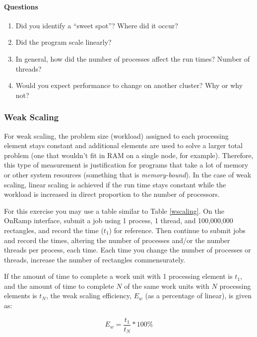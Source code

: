\documentclass[a4paper, 11pt]{article}
\begin{document}
\bigskip
\paragraph{Questions}
\begin{enumerate}
\item Did you identify a ``sweet spot''? Where did it occur?
\item Did the program scale linearly?
\item In general, how did the number of processes affect the run times? Number of threads?
\item Would you expect performance to change on another cluster? Why or why not?
\end{enumerate}


\subsubsection{Weak Scaling}

For weak scaling, the problem size (workload) assigned to each processing element stays constant and additional elements are used to solve a larger total problem (one that wouldn't fit in RAM on a single node, for example). Therefore, this type of measurement is justification for programs that take a lot of memory or other system resources (something that is \emph{memory-bound}). In the case of weak scaling, linear scaling is achieved if the run time stays constant while the workload is increased in direct proportion to the number of processors\cite{website:SHARCNET:2015}.

For this exercise you may use a table similar to Table \ref{wscaling}. On the OnRamp interface, submit a job using 1 process, 1 thread, and 100,000,000 rectangles, and record the time ($t_{1}$) for reference. Then continue to submit jobs and record the times, altering the number of processes and/or the number threads per process, each time. Each time you change the number of processes or threads, increase the number of rectangles commensurately.

If the amount of time to complete a work unit with 1 processing element is $t_{1}$, and the amount of time to complete $N$ of the same work units with $N$ processing elements is $t_{N}$, the weak scaling efficiency, $E_{w}$ (as a percentage of linear), is given as\cite{website:SHARCNET:2015}:

\begin{equation}
\label{weakEff}
	E_{w} = \frac{t_{1}}{t_{N}} * 100\%
\end{equation}
\end{document}
